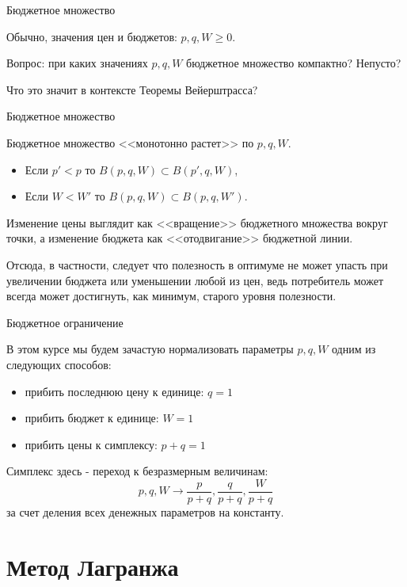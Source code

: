 \documentclass{beamer}
\begin{document}
\begin{frame}{Бюджетное множество}

Обычно, значения цен и бюджетов: $p,q,W \geqslant 0$. 

Вопрос: при каких значениях $p,q,W$ бюджетное множество компактно? Непусто? 

Что это значит в контексте Теоремы Вейерштрасса?

\end{frame}

\begin{frame}{Бюджетное множество}

Бюджетное множество <<монотонно растет>> по $p,q,W$.

\begin{itemize}
  \item Если $p'<p$ то $B(p,q,W) \subset B(p',q,W)$,
  \item Если $W<W'$ то $B(p,q,W) \subset B(p,q,W')$.
\end{itemize}

Изменение цены выглядит как <<вращение>> бюджетного множества вокруг точки, а изменение бюджета как <<отодвигание>> бюджетной линии.

Отсюда, в частности, следует что \alert{полезность в оптимуме не может упасть при увеличении бюджета или уменьшении любой из цен}, ведь потребитель может всегда может достигнуть, как минимум, старого уровня полезности.

\end{frame}

\begin{frame}{Бюджетное ограничение}

В этом курсе мы будем зачастую нормализовать параметры $p,q,W$ одним из следующих способов:

\begin{itemize}
  \item прибить последнюю цену к единице: $q = 1$
  \item прибить бюджет к единице: $W = 1$
  \item прибить цены к симплексу: $p + q = 1$
\end{itemize}

Симплекс здесь - переход к безразмерным величинам:
$$ p,q,W \to \frac{p}{p+q},\frac{q}{p+q},\frac{W}{p+q}$$
за счет деления всех денежных параметров на константу.

\end{frame}

\section{Метод Лагранжа}
\end{document}
